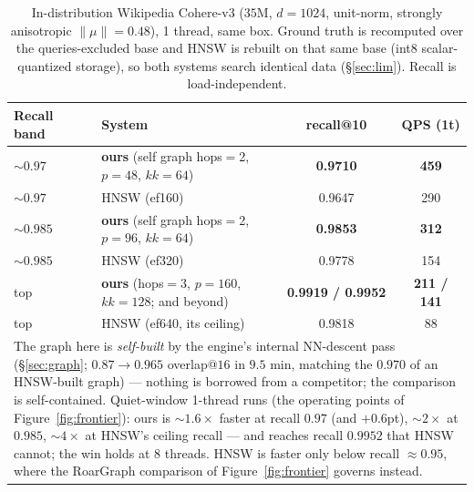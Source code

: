 \documentclass{article}
\begin{document}
\begin{table}[t]
\centering
\caption{In-distribution Wikipedia Cohere-v3 ($35$M, $d{=}1024$, unit-norm, strongly
anisotropic $\lVert\mu\rVert{=}0.48$), 1 thread, same box. Ground truth is recomputed
over the queries-excluded base and HNSW is rebuilt on that same base (int8 scalar-quantized
storage), so both systems search identical data (\S\ref{sec:lim}). Recall is
load-independent.}
\label{tab:wiki35m}
\begin{tabular}{llcc}
\toprule
Recall band & System & recall@10 & QPS (1t) \\
\midrule
${\sim}0.97$ & \textbf{ours} (self graph hops$=$2, $p{=}48$, $kk{=}64$) & \textbf{0.9710} & \textbf{459} \\
${\sim}0.97$ & HNSW (ef160)                                     & 0.9647 & 290 \\
\midrule
${\sim}0.985$ & \textbf{ours} (self graph hops$=$2, $p{=}96$, $kk{=}64$) & \textbf{0.9853} & \textbf{312} \\
${\sim}0.985$ & HNSW (ef320)                                     & 0.9778 & 154 \\
\midrule
top           & \textbf{ours} (hops$=$3, $p{=}160$, $kk{=}128$; and beyond) & \textbf{0.9919 / 0.9952} & \textbf{211 / 141} \\
top           & HNSW (ef640, its ceiling)                        & 0.9818 & 88 \\
\bottomrule
\multicolumn{4}{p{0.92\linewidth}}{\footnotesize The graph here is \emph{self-built} by
the engine's internal NN-descent pass (\S\ref{sec:graph}; $0.87\to0.965$ overlap@$16$ in
$9.5$ min, matching the $0.970$ of an HNSW-built graph) --- nothing is borrowed from a
competitor; the comparison is self-contained. Quiet-window 1-thread runs (the operating
points of Figure~\ref{fig:frontier}): ours is ${\sim}1.6\times$ faster at recall $0.97$
(and $+0.6$pt), ${\sim}2\times$ at $0.985$, ${\sim}4\times$ at HNSW's ceiling recall ---
and reaches recall $0.9952$ that HNSW cannot; the win holds at 8 threads. HNSW is faster
only below recall ${\approx}0.95$, where the RoarGraph comparison of
Figure~\ref{fig:frontier} governs instead.} \\
\end{tabular}
\end{table}
\end{document}
